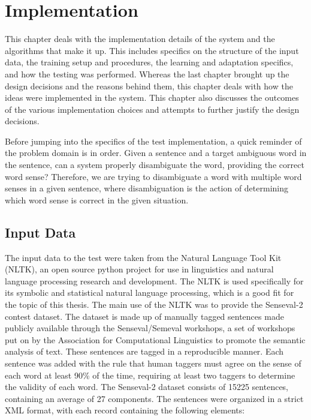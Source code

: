 \chapter{Implementation}

This chapter deals with the implementation details of the system and the
algorithms that make it up. This includes specifics on the structure of the
input data, the training setup and procedures, the learning and adaptation
specifics, and how the testing was performed. Whereas the last chapter brought
up the design decisions and the reasons behind them, this chapter deals with how
the ideas were implemented in the system. This chapter also discusses the outcomes of
the various implementation choices and attempts to further justify the design
decisions.

Before jumping into the specifics of the test implementation, a quick reminder
of the problem domain is in order.  Given a sentence and a target ambiguous word in
the sentence, can a system properly disambiguate the word, providing the correct
word sense?  Therefore, we are trying to disambiguate a word with multiple word
senses in a given sentence, where disambiguation is the action of determining
which word sense is correct in the given situation.

\section{Input Data} 

The input data to the test were taken from the Natural
Language Tool Kit (NLTK), an open source python project for use in linguistics
and natural language processing research and development.  The NLTK is used
specifically for its symbolic and statistical natural language processing, which
is a good fit for the topic of this thesis.  The main use of the NLTK was to
provide the Senseval-2 contest dataset. The dataset is made up of manually
tagged sentences made publicly available through the Senseval/Semeval workshops,
a set of workshops put on by the Association for Computational Linguistics to
promote the semantic analysis of text. These sentences are tagged in a
reproducible manner. Each sentence was added with the rule that human taggers
must agree on the sense of each word at least 90\% of the time, requiring at
least two taggers to determine the validity of each word.  The Senseval-2
dataset consists of 15225 sentences, containing an average of 27 components.  The
sentences were organized in a strict XML format, with each record containing the
following elements:


